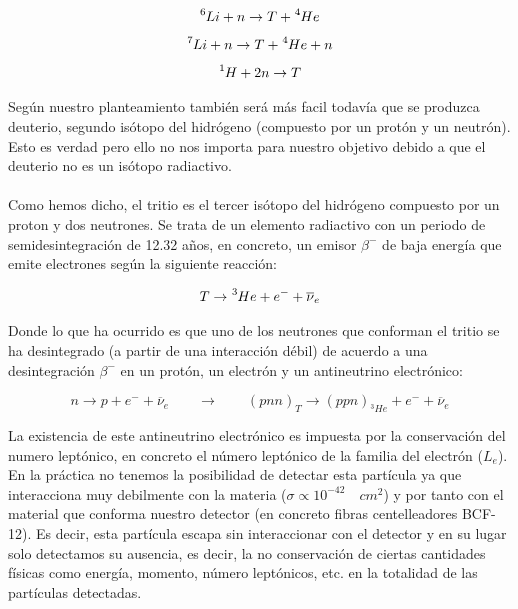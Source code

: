 $$\ce{^{6}{Li}} + n \rightarrow T + \ce{^{4}{He}}$$
$$\ce{^{7}{Li}} + n \rightarrow T + \ce{^{4}{He}} + n$$
$$\ce{^{1}{H}} + 2n \rightarrow T $$

Según nuestro planteamiento también será más facil todavía que se produzca deuterio, segundo isótopo del hidrógeno (compuesto por un protón y un neutrón). Esto es verdad pero ello no nos importa para nuestro objetivo debido a que el deuterio no es un isótopo radiactivo.

\paragraph {}
Como hemos dicho, el tritio es el tercer isótopo del hidrógeno compuesto por un proton y dos neutrones. Se trata de un elemento radiactivo con un periodo de semidesintegración de 12.32 años, en concreto, un emisor $\beta^-$ de baja energía que emite electrones según la siguiente reacción:

$$T \rightarrow \ce{^{3}{He}} + e^- + \overline{\nu}_e$$

Donde lo que ha ocurrido es que uno de los neutrones que conforman el tritio se ha desintegrado (a partir de una interacción débil) de acuerdo a una desintegración $\beta^-$ en un protón, un electrón y un antineutrino electrónico:

$$n \rightarrow p + e^- + \overline{\nu}_e \qquad \rightarrow \qquad (pnn)_T\rightarrow (ppn)_{^3He} + e^- + \overline{\nu}_e $$

La existencia de este antineutrino electrónico es impuesta por la conservación del numero leptónico, en concreto el número leptónico de la familia del electrón ($L_e$). En la práctica no tenemos la posibilidad de detectar esta partícula ya que interacciona muy debilmente con la materia ($\sigma \propto 10^{-42} \quad cm^2$) y por tanto con el material que conforma nuestro detector (en concreto fibras centelleadores BCF-12). Es decir, esta partícula escapa sin interaccionar con el detector y en su lugar solo detectamos su ausencia, es decir, la no conservación de ciertas cantidades físicas como energía, momento, número leptónicos, etc. en la totalidad de las partículas detectadas.

